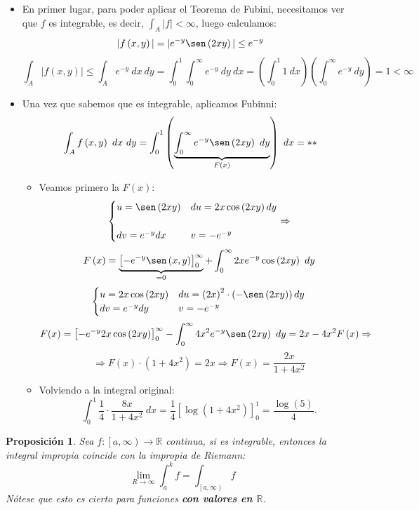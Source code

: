 \documentclass[10pt,a4paper,openright]{book}
\theoremstyle{break}
\newtheorem*{prop}{Proposición}
\newcommand{\dif}[1]{\ d#1}
\begin{document}
\begin{itemize}
    \item En primer lugar, para poder aplicar el Teorema de Fubini, necesitamos ver que $f$ es integrable, es decir, $\int_A \vert f\vert < \infty$, luego calculamos:
    $$\vert f \left(x, y\right)\vert = \vert e^{-y} \sen \left(2xy\right)\vert \le e^{-y}$$
    $$\int_A \vert f \left(x, y\right) \vert \le \int_A e^{-y} \dif{x} \dif{y} = \int_0^1 \int_0^{\infty} e^{-y} \dif{y} \dif{x} = \left(\int_0^1 1 \dif{x}  \right) \left(\int_0^{\infty} e^{-y} \dif{y} \right) = 1 < \infty $$
\item Una vez que sabemos que es integrable, aplicamos Fubinni:
    $$\int_A f \left(x, y\right) \dif{x} \dif{y} = \int_0^1 \left(\underbrace{\int_0^{\infty} e^{-y}\sen\left(2xy\right) \dif{y}}_{F \left(x\right)} \right) \dif{x}  = **$$
    \begin{itemize}
    	\item Veamos primero la $F \left(x\right)$:
    $$\begin{cases}
        u = \sen \left(2xy\right) & du = 2x \cos \left(2xy\right)dy \\\\
        dv = e^{-y}dx & v = -e^{-y}
    \end{cases} \Rightarrow$$
    $$F \left(x\right) = \underbrace{\left[-e^{-y} \sen \left(x, y\right)\right]_{0}^{\infty}}_{= 0} + \int_0^{\infty} 2xe^{-y}\cos \left(2xy\right) \dif{y}$$
    $$\begin{cases}
        u = 2x\cos \left(2xy\right) & du = \left(2x\right)^2 \cdot \left(-\sen \left(2xy\right)\right)dy \\
        dv = e^{-y}dy & v = -e^{-y}
    \end{cases}$$
    $$F(x)=\left[-e^{-y}2x \cos \left(2xy\right)\right]_{0}^{\infty} - \int_0^{\infty} 4x^2e^{-y}\sen \left(2xy\right) \dif{y} = 2x - 4x^2 F \left(x\right)\Rightarrow$$
    $$\Rightarrow F \left(x\right) \cdot \left(1 + 4x^2\right) = 2x \Rightarrow F \left(x\right) = \frac{2x}{1+4x^2}$$
    	\item Volviendo a la integral original:
    $$\int_0^1 \frac{1}{4} \cdot \frac{8x}{1+4x^2} \dif{x} = \frac{1}{4} \left[\log \left(1 + 4x^2\right)\right]_{0}^{1} = \frac{\log \left(5\right)}{4}.$$
    \end{itemize}
\end{itemize}

\begin{prop}
Sea $f: \left[a, \infty\right) \rightarrow \mathbb{R}$ continua, si es integrable, entonces la integral impropia coincide con la impropia de Riemann:
$$\lim_{R \rightarrow \infty} \int_a^k f = \int_{\left[a, \infty\right)} f $$
Nótese que esto es cierto para funciones \textbf{con valores en $\mathbb{R}$}.
\end{prop}
\end{document}
